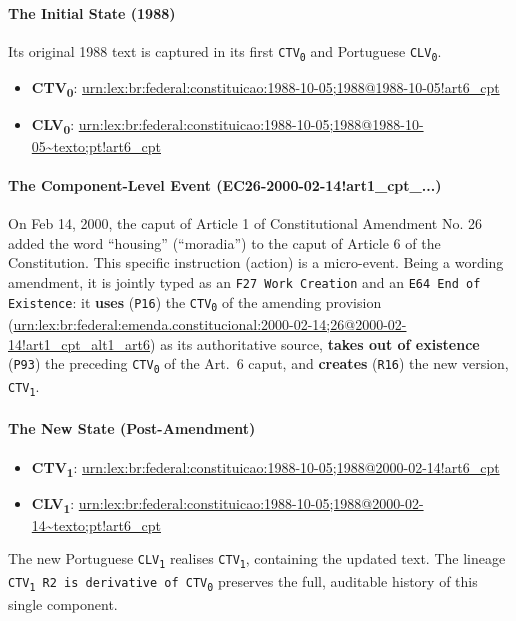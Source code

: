 \documentclass[11pt]{article}
\begin{document}
\paragraph{The Initial State (1988)}
Its original 1988 text is captured in its first \texttt{CTV\textsubscript{0}} and Portuguese \texttt{CLV\textsubscript{0}}.
\begin{itemize}
\item \textbf{CTV\textsubscript{0}}: \url{urn:lex:br:federal:constituicao:1988-10-05;1988@1988-10-05!art6_cpt}
\item \textbf{CLV\textsubscript{0}}: \url{urn:lex:br:federal:constituicao:1988-10-05;1988@1988-10-05~texto;pt!art6_cpt}
\end{itemize}

\paragraph{The Component-Level Event (EC26-2000-02-14!art1\_cpt\_...)}
On Feb 14, 2000, the caput of Article 1 of Constitutional Amendment No. 26 added the word “housing” (“moradia”) to the caput of Article 6 of the Constitution. This specific instruction (action) is a micro-event. Being a wording amendment, it is jointly typed as an \texttt{F27 Work Creation} and an \texttt{E64 End of Existence}: it \textbf{uses} (\texttt{P16}) the \texttt{CTV\textsubscript{0}} of the amending provision (\url{urn:lex:br:federal:emenda.constitucional:2000-02-14;26@2000-02-14!art1_cpt_alt1_art6}) as its authoritative source, \textbf{takes out of existence} (\texttt{P93}) the preceding \texttt{CTV\textsubscript{0}} of the Art.~6 caput, and \textbf{creates} (\texttt{R16}) the new version, \texttt{CTV\textsubscript{1}}.

\paragraph{The New State (Post-Amendment)}
\begin{itemize}
\item \textbf{CTV\textsubscript{1}}: \url{urn:lex:br:federal:constituicao:1988-10-05;1988@2000-02-14!art6_cpt}
\item \textbf{CLV\textsubscript{1}}: \url{urn:lex:br:federal:constituicao:1988-10-05;1988@2000-02-14~texto;pt!art6_cpt}
\end{itemize}
The new Portuguese \texttt{CLV\textsubscript{1}} realises \texttt{CTV\textsubscript{1}}, containing the updated text. The lineage \texttt{CTV\textsubscript{1} R2 is derivative of CTV\textsubscript{0}} preserves the full, auditable history of this single component.
\end{document}
